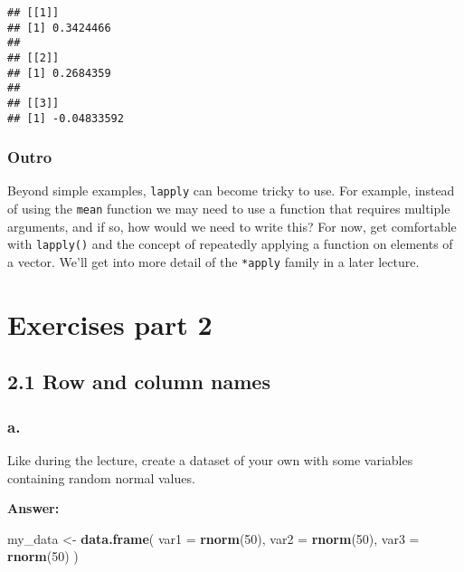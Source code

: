 \documentclass[]{article}
\newenvironment{Shaded}{\begin{snugshade}}{\end{snugshade}}
\newcommand{\DataTypeTok}[1]{\textcolor[rgb]{0.13,0.29,0.53}{#1}}
\newcommand{\DecValTok}[1]{\textcolor[rgb]{0.00,0.00,0.81}{#1}}
\newcommand{\KeywordTok}[1]{\textcolor[rgb]{0.13,0.29,0.53}{\textbf{#1}}}
\newcommand{\NormalTok}[1]{#1}
\newcommand{\StringTok}[1]{\textcolor[rgb]{0.31,0.60,0.02}{#1}}
\begin{document}
\begin{verbatim}
## [[1]]
## [1] 0.3424466
## 
## [[2]]
## [1] 0.2684359
## 
## [[3]]
## [1] -0.04833592
\end{verbatim}

\hypertarget{outro}{%
\subsubsection{Outro}\label{outro}}

Beyond simple examples, \texttt{lapply} can become tricky to use. For
example, instead of using the \texttt{mean} function we may need to use
a function that requires multiple arguments, and if so, how would we
need to write this? For now, get comfortable with \texttt{lapply()} and
the concept of repeatedly applying a function on elements of a vector.
We'll get into more detail of the \texttt{*apply} family in a later
lecture.

\newpage

\hypertarget{exercises-part-2}{%
\section{Exercises part 2}\label{exercises-part-2}}

\hypertarget{row-and-column-names}{%
\subsection{2.1 Row and column names}\label{row-and-column-names}}

\hypertarget{a.-4}{%
\subsubsection{a.}\label{a.-4}}

Like during the lecture, create a dataset of your own with some
variables containing random normal values.

\textbf{Answer:}

\begin{Shaded}
\begin{Highlighting}[]
\NormalTok{my_data <-}\StringTok{ }\KeywordTok{data.frame}\NormalTok{(}
  \DataTypeTok{var1 =} \KeywordTok{rnorm}\NormalTok{(}\DecValTok{50}\NormalTok{), }
  \DataTypeTok{var2 =} \KeywordTok{rnorm}\NormalTok{(}\DecValTok{50}\NormalTok{), }
  \DataTypeTok{var3 =} \KeywordTok{rnorm}\NormalTok{(}\DecValTok{50}\NormalTok{)}
\NormalTok{)}
\end{Highlighting}
\end{Shaded}
\end{document}

